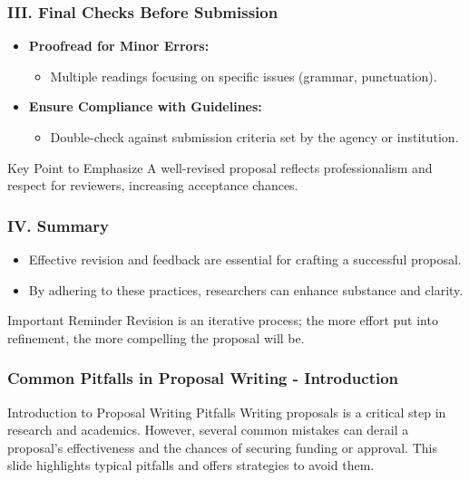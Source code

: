 \documentclass[aspectratio=169]{beamer}
\begin{document}
\begin{frame}[fragile]
    \frametitle{III. Final Checks Before Submission}
    \begin{itemize}
        \item \textbf{Proofread for Minor Errors:}
        \begin{itemize}
            \item Multiple readings focusing on specific issues (grammar, punctuation).
        \end{itemize}

        \item \textbf{Ensure Compliance with Guidelines:}
        \begin{itemize}
            \item Double-check against submission criteria set by the agency or institution.
        \end{itemize}
    \end{itemize}
    \begin{block}{Key Point to Emphasize}
        A well-revised proposal reflects professionalism and respect for reviewers, increasing acceptance chances.
    \end{block}
\end{frame}

\begin{frame}[fragile]
    \frametitle{IV. Summary}
    \begin{itemize}
        \item Effective revision and feedback are essential for crafting a successful proposal.
        \item By adhering to these practices, researchers can enhance substance and clarity.
    \end{itemize}
    \begin{block}{Important Reminder}
        Revision is an iterative process; the more effort put into refinement, the more compelling the proposal will be.
    \end{block}
\end{frame}

\begin{frame}[fragile]
    \frametitle{Common Pitfalls in Proposal Writing - Introduction}
    \begin{block}{Introduction to Proposal Writing Pitfalls}
        Writing proposals is a critical step in research and academics. However, several common mistakes can derail a proposal's effectiveness and the chances of securing funding or approval. This slide highlights typical pitfalls and offers strategies to avoid them.
    \end{block}
\end{frame}
\end{document}

